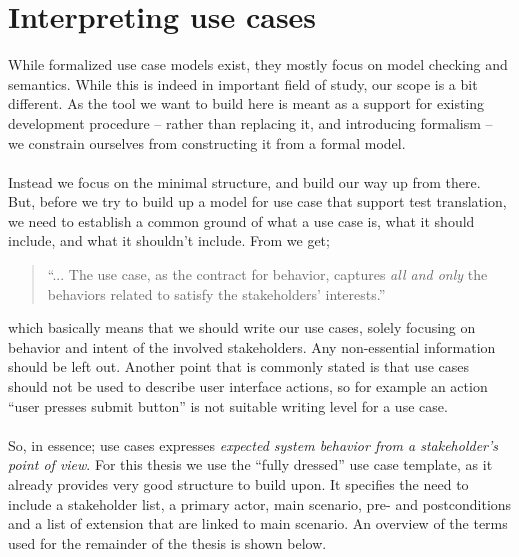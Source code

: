 \section{Interpreting use cases}
While formalized use case models exist\cite{klimek2010formal}, they mostly focus on model checking and semantics. While this is indeed in important field of study, our scope is a bit different. As the tool we want to build here is meant as a support for existing development procedure -- rather than replacing it, and introducing formalism -- we constrain ourselves from constructing it from a formal model.\\\\
Instead we focus on the minimal structure, and build our way up from there. But, before we try to build up a model for use case that support test translation, we need to establish a common ground of what a use case is, what it should include, and what it shouldn't include. From \cite{cockburn2000} we get;
\begin{quote}
``... The use case, as the contract for behavior, captures \emph{all and only} the behaviors related to satisfy the stakeholders’ interests.''
\end{quote}which basically means that we should write our use cases, solely focusing on behavior and intent of the involved stakeholders. Any non-essential information should be left out. Another point that is commonly stated is that use cases should not be used to describe user interface actions, so for example an action ``user presses submit button'' is not suitable writing level for a use case.\\\\
So, in essence; use cases expresses \emph{expected system behavior from a stakeholder's point of view}. For this thesis we use the ``fully dressed'' use case template\cite{larman2005}, as it already provides very good structure to build upon. It specifies the need to include a stakeholder list, a primary actor, main scenario, pre- and postconditions and a list of extension that are linked to main scenario. An overview of the terms used for the remainder of the thesis is shown below.
